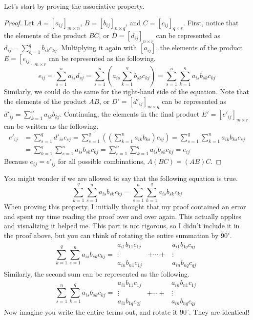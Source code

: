 \documentclass[../../main.tex]{subfiles}
\begin{document}
Let's start by proving the associative property.
\begin{proof}
Let $A = [a_{ij}]_{m \times n}$, $B = [b_{ij}]_{n \times q}$,
and $C = [c_{ij}]_{q \times r}$. First, notice that the elements
of the product $BC$, or $D = [d_{ij}]_{n \times r}$ can be
represented as $d_{ij} = \sum_{k=1}^{q} b_{ik} c_{kj}$. Multiplying
it again with $[a_{ij}]$, the elements of the product
$E = [e_{ij}]_{m \times r}$ can be represented as the following.
\[
e_{ij}
= \sum_{s=1}^{n} a_{is} d_{sj}
= \sum_{s=1}^{n} \left(
    a_{is} \sum_{k=1}^{q} b_{sk} c_{kj}
\right)
= \sum_{s=1}^{n} \sum_{k=1}^{q} a_{is} b_{sk} c_{kj}
\]
Similarly, we could do the same for the right-hand side of the
equation. Note that the elements of the product $AB$, or
$D' = [d'_{ij}]_{m \times q}$ can be represented as
$d'_{ij} = \sum_{k=1}^{n} a_{ik} b_{kj}$. Continuing, the elements
in the final product $E' = [e'_{ij}]_{m \times r}$ can be written as
the following.
\begin{align*}
    e'_{ij}
    &= \sum_{s=1}^{q} d'_{is} c_{sj}
    = \sum_{s=1}^{q} \left(
        \left(\sum_{k=1}^{n} a_{ik} b_{ks} \right) c_{sj}
    \right)
    = \sum_{s=1}^{q} \sum_{k=1}^{n} a_{ik} b_{ks} c_{sj} \\
    &= \sum_{k=1}^{q} \sum_{s=1}^{n} a_{is} b_{sk} c_{kj}
    = \sum_{s=1}^{n} \sum_{k=1}^{q} a_{is} b_{sk} c_{kj}
    = e_{ij}
\end{align*}
Because $e_{ij} = e'_{ij}$ for all possible combinations,
$A(BC) = (AB)C$.
\end{proof}
\begin{thoughts}
You might wonder if we are allowed to say that the following equation
is true.
\[
\sum_{k=1}^{q} \sum_{s=1}^{n} a_{is} b_{sk} c_{kj}
= \sum_{s=1}^{n} \sum_{k=1}^{q} a_{is} b_{sk} c_{kj}
\]
When proving this property, I initially thought that my proof
contained an error and spent my time reading the proof over and
over again. This actually applies and visualizing it helped me.
This part is not rigorous, so I didn't include it in the proof
above, but you can think of rotating the entire summation by
$90^\circ$.
\[
\sum_{k=1}^{q} \sum_{s=1}^{n} a_{is} b_{sk} c_{kj}
=
\begin{array}{ccc}
    a_{i1}b_{11}c_{1j} & & a_{i1}b_{1q}c_{qj} \\
    \vdots & + \cdots + & \vdots \\
    a_{in}b_{n1}c_{1j} & & a_{in}b_{nq}c_{qj}
\end{array}
\]
Similarly, the second sum can be represented as the following.
\[
\sum_{s=1}^{n} \sum_{k=1}^{q} a_{is} b_{sk} c_{kj}
=
\begin{array}{ccc}
    a_{i1}b_{11}c_{1j} & & a_{in}b_{n1}c_{1j} \\
    \vdots & + \cdots + & \vdots \\
    a_{i1}b_{1q}c_{qj} & & a_{in}b_{nq}c_{qj}
\end{array}
\]
Now imagine you write the entire terms out, and rotate it
$90^\circ$. They are identical!
\end{thoughts}
\end{document}
